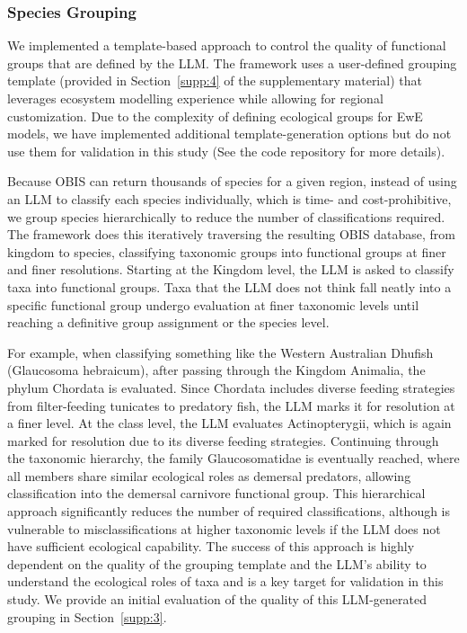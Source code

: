 \subsubsection{Species Grouping}

We implemented a template-based approach to control the quality of functional groups that are defined by the LLM. The framework uses a user-defined grouping template (provided in Section~\ref{supp:4} of the supplementary material) that leverages ecosystem modelling experience while allowing for regional customization. Due to the complexity of defining ecological groups for EwE models, we have implemented additional template-generation options but do not use them for validation in this study (See the code repository for more details).

Because OBIS can return thousands of species for a given region, instead of using an LLM to classify each species individually, which is time- and cost-prohibitive, we group species hierarchically to reduce the number of classifications required. The framework does this iteratively traversing the resulting OBIS database, from kingdom to species, classifying taxonomic groups into functional groups at finer and finer resolutions. Starting at the Kingdom level, the LLM is asked to classify taxa into functional groups. Taxa that the LLM does not think fall neatly into a specific functional group undergo evaluation at finer taxonomic levels until reaching a definitive group assignment or the species level. 

For example, when classifying something like the Western Australian Dhufish (Glaucosoma hebraicum), after passing through the Kingdom Animalia, the phylum Chordata is evaluated. Since Chordata includes diverse feeding strategies from filter-feeding tunicates to predatory fish, the LLM marks it for resolution at a finer level. At the class level, the LLM evaluates Actinopterygii, which is again marked for resolution due to its diverse feeding strategies. Continuing through the taxonomic hierarchy, the family Glaucosomatidae is eventually reached, where all members share similar ecological roles as demersal predators, allowing classification into the demersal carnivore functional group. This hierarchical approach significantly reduces the number of required classifications, although is vulnerable to misclassifications at higher taxonomic levels if the LLM does not have sufficient ecological capability. The success of this approach is highly dependent on the quality of the grouping template and the LLM's ability to understand the ecological roles of taxa and is a key target for validation in this study. We provide an initial evaluation of the quality of this LLM-generated grouping in Section~\ref{supp:3}.


